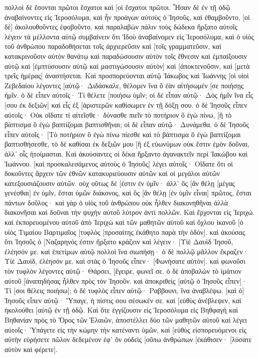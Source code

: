 πολλοὶ δὲ ἔσονται πρῶτοι ἔσχατοι καὶ [οἱ ἔσχατοι πρῶτοι. 
Ἦσαν δὲ ἐν τῇ ὁδῷ ἀναβαίνοντες εἰς Ἱεροσόλυμα, καὶ ἦν προάγων αὐτοὺς ὁ Ἰησοῦς, καὶ ἐθαμβοῦντο, [οἱ δὲ] ἀκολουθοῦντες ἐφοβοῦντο. καὶ παραλαβὼν πάλιν τοὺς δώδεκα ἤρξατο αὐτοῖς λέγειν τὰ μέλλοντα αὐτῷ συμβαίνειν 
ὅτι Ἰδοὺ ἀναβαίνομεν εἰς Ἱεροσόλυμα, καὶ ὁ υἱὸς τοῦ ἀνθρώπου παραδοθήσεται τοῖς ἀρχιερεῦσιν καὶ [τοῖς γραμματεῦσιν, καὶ κατακρινοῦσιν αὐτὸν θανάτῳ καὶ παραδώσουσιν αὐτὸν τοῖς ἔθνεσιν 
καὶ ἐμπαίξουσιν αὐτῷ καὶ [ἐμπτύσουσιν αὐτῷ καὶ μαστιγώσουσιν αὐτὸν] καὶ [ἀποκτενοῦσιν, καὶ [μετὰ τρεῖς ἡμέρας] ἀναστήσεται. 
Καὶ προσπορεύονται αὐτῷ Ἰάκωβος καὶ Ἰωάννης [οἱ υἱοὶ Ζεβεδαίου λέγοντες [αὐτῷ· Διδάσκαλε, θέλομεν ἵνα ὃ ἐὰν αἰτήσωμέν [σε ποιήσῃς ἡμῖν. 
ὁ δὲ εἶπεν αὐτοῖς· Τί θέλετε [ποιήσω ὑμῖν; 
οἱ δὲ εἶπαν αὐτῷ· Δὸς ἡμῖν ἵνα εἷς [σου ἐκ δεξιῶν] καὶ εἷς ἐξ [ἀριστερῶν καθίσωμεν ἐν τῇ δόξῃ σου. 
ὁ δὲ Ἰησοῦς εἶπεν αὐτοῖς· Οὐκ οἴδατε τί αἰτεῖσθε· δύνασθε πιεῖν τὸ ποτήριον ὃ ἐγὼ πίνω, [ἢ τὸ βάπτισμα ὃ ἐγὼ βαπτίζομαι βαπτισθῆναι; 
οἱ δὲ εἶπαν αὐτῷ· Δυνάμεθα. ὁ δὲ Ἰησοῦς εἶπεν αὐτοῖς· [Τὸ ποτήριον ὃ ἐγὼ πίνω πίεσθε καὶ τὸ βάπτισμα ὃ ἐγὼ βαπτίζομαι βαπτισθήσεσθε, 
τὸ δὲ καθίσαι ἐκ δεξιῶν μου [ἢ ἐξ εὐωνύμων οὐκ ἔστιν ἐμὸν δοῦναι, ἀλλ᾽ οἷς ἡτοίμασται. 
Καὶ ἀκούσαντες οἱ δέκα ἤρξαντο ἀγανακτεῖν περὶ Ἰακώβου καὶ Ἰωάννου. 
[καὶ προσκαλεσάμενος αὐτοὺς ὁ Ἰησοῦς] λέγει αὐτοῖς· Οἴδατε ὅτι οἱ δοκοῦντες ἄρχειν τῶν ἐθνῶν κατακυριεύουσιν αὐτῶν καὶ οἱ μεγάλοι αὐτῶν κατεξουσιάζουσιν αὐτῶν. 
οὐχ οὕτως δέ [ἐστιν ἐν ὑμῖν· ἀλλ᾽ ὃς [ἂν θέλῃ [μέγας γενέσθαι] ἐν ὑμῖν, ἔσται ὑμῶν διάκονος, 
καὶ ὃς [ἂν θέλῃ [ἐν ὑμῖν εἶναι] πρῶτος, ἔσται πάντων δοῦλος· 
καὶ γὰρ ὁ υἱὸς τοῦ ἀνθρώπου οὐκ ἦλθεν διακονηθῆναι ἀλλὰ διακονῆσαι καὶ δοῦναι τὴν ψυχὴν αὐτοῦ λύτρον ἀντὶ πολλῶν. 
Καὶ ἔρχονται εἰς Ἰεριχώ. καὶ ἐκπορευομένου αὐτοῦ ἀπὸ Ἰεριχὼ καὶ τῶν μαθητῶν αὐτοῦ καὶ ὄχλου ἱκανοῦ [ὁ υἱὸς Τιμαίου Βαρτιμαῖος [τυφλὸς [προσαίτης ἐκάθητο παρὰ τὴν ὁδόν]. 
καὶ ἀκούσας ὅτι Ἰησοῦς ὁ [Ναζαρηνός ἐστιν ἤρξατο κράζειν καὶ λέγειν· [Υἱὲ Δαυὶδ Ἰησοῦ, ἐλέησόν με. 
καὶ ἐπετίμων αὐτῷ πολλοὶ ἵνα σιωπήσῃ· ὁ δὲ πολλῷ μᾶλλον ἔκραζεν· Υἱὲ Δαυίδ, ἐλέησόν με. 
καὶ στὰς ὁ Ἰησοῦς εἶπεν· [Φωνήσατε αὐτόν]. καὶ φωνοῦσι τὸν τυφλὸν λέγοντες αὐτῷ· Θάρσει, [ἔγειρε, φωνεῖ σε. 
ὁ δὲ ἀποβαλὼν τὸ ἱμάτιον αὐτοῦ [ἀναπηδήσας ἦλθεν πρὸς τὸν Ἰησοῦν. 
καὶ ἀποκριθεὶς [αὐτῷ ὁ Ἰησοῦς εἶπεν]· Τί [σοι θέλεις ποιήσω]; ὁ δὲ τυφλὸς εἶπεν αὐτῷ· Ραββουνι, ἵνα ἀναβλέψω. 
[καὶ ὁ] Ἰησοῦς εἶπεν αὐτῷ· Ὕπαγε, ἡ πίστις σου σέσωκέν σε. καὶ [εὐθὺς ἀνέβλεψεν, καὶ ἠκολούθει [αὐτῷ ἐν τῇ ὁδῷ. 
Καὶ ὅτε ἐγγίζουσιν εἰς Ἱεροσόλυμα εἰς Βηθφαγὴ καὶ Βηθανίαν πρὸς τὸ Ὄρος τῶν Ἐλαιῶν, ἀποστέλλει δύο τῶν μαθητῶν αὐτοῦ 
καὶ λέγει αὐτοῖς· Ὑπάγετε εἰς τὴν κώμην τὴν κατέναντι ὑμῶν, καὶ [εὐθὺς εἰσπορευόμενοι εἰς αὐτὴν εὑρήσετε πῶλον δεδεμένον ἐφ᾽ ὃν οὐδεὶς [οὔπω ἀνθρώπων [ἐκάθισεν· [λύσατε αὐτὸν καὶ φέρετε]. 
